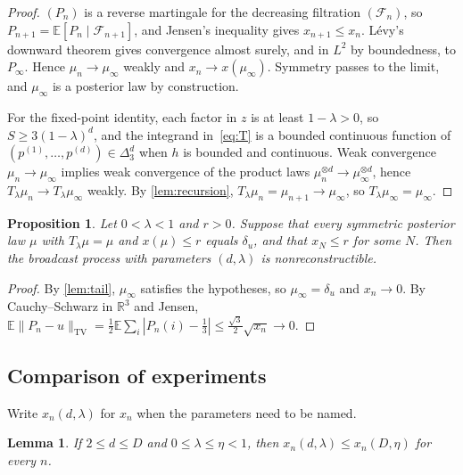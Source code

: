 \documentclass[11pt]{amsart}
\newtheorem{proposition}[theorem]{Proposition}
\newtheorem{lemma}[theorem]{Lemma}
\theoremstyle{definition}
\theoremstyle{remark}
\newcommand{\E}{\mathbb{E}}
\newcommand{\R}{\mathbb{R}}
\newcommand{\Simp}{\Delta_3}
\begin{document}
\begin{proof}
$(P_n)$ is a reverse martingale for the decreasing filtration $(\mathcal F_n)$, so
$P_{n+1}=\E[P_n\mid\mathcal F_{n+1}]$, and Jensen's inequality gives $x_{n+1}\le x_n$. L\'evy's downward
theorem gives convergence almost surely, and in $L^2$ by boundedness, to $P_\infty$. Hence $\mu_n\to\mu_\infty$
weakly and $x_n\to x(\mu_\infty)$. Symmetry passes to the limit, and $\mu_\infty$ is a posterior law by
construction.

For the fixed-point identity, each factor in $z$ is at least $1-\lambda>0$, so $S\ge3(1-\lambda)^d$, and
the integrand in~\eqref{eq:T} is a bounded continuous function of $(p^{(1)},\dots,p^{(d)})\in\Simp^d$ when
$h$ is bounded and continuous. Weak convergence $\mu_n\to\mu_\infty$ implies weak convergence of the product
laws $\mu_n^{\otimes d}\to\mu_\infty^{\otimes d}$, hence $T_\lambda\mu_n\to T_\lambda\mu_\infty$ weakly. By
\cref{lem:recursion}, $T_\lambda\mu_n=\mu_{n+1}\to\mu_\infty$, so $T_\lambda\mu_\infty=\mu_\infty$.
\end{proof}

\begin{proposition}\label{prop:reduction}
Let $0<\lambda<1$ and $r>0$. Suppose that every symmetric posterior law $\mu$ with $T_\lambda\mu=\mu$ and
$x(\mu)\le r$ equals $\delta_u$, and that $x_N\le r$ for some $N$. Then the broadcast process with
parameters $(d,\lambda)$ is nonreconstructible.
\end{proposition}

\begin{proof}
By \cref{lem:tail}, $\mu_\infty$ satisfies the hypotheses, so $\mu_\infty=\delta_u$ and $x_n\to0$. By
Cauchy--Schwarz in $\R^3$ and Jensen,
$\E\|P_n-u\|_{\mathrm{TV}}=\tfrac12\E\sum_i|P_n(i)-\tfrac13|\le\tfrac{\sqrt3}2\sqrt{x_n}\to0$.
\end{proof}

\subsection{Comparison of experiments}
Write $x_n(d,\lambda)$ for $x_n$ when the parameters need to be named.

\begin{lemma}\label{lem:compare}
If $2\le d\le D$ and $0\le\lambda\le\eta<1$, then $x_n(d,\lambda)\le x_n(D,\eta)$ for every $n$.
\end{lemma}
\end{document}
